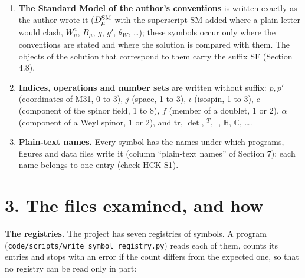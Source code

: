 \documentclass[
  10pt,
]{article}
\begin{document}
\begin{enumerate}
  the author's name of the group.
\item
  \textbf{The Standard Model of the author's conventions} is written
  exactly as the author wrote it (\(D^{\rm SM}_\mu\) with the
  superscript SM added where a plain letter would clash, \(W^a_\mu\),
  \(B_\mu\), \(g\), \(g'\), \(\theta_W\), \ldots); these symbols occur
  only where the conventions are stated and where the solution is
  compared with them. The objects of the solution that correspond to
  them carry the suffix SF (Section 4.8).
\item
  \textbf{Indices, operations and number sets} are written without
  suffix: \(p,p'\) (coordinates of M31, 0 to 3), \(j\) (space, 1 to 3),
  \(\iota\) (isospin, 1 to 3), \(c\) (component of the spinor field, 1
  to 8), \(f\) (member of a doublet, 1 or 2), \(\alpha\) (component of a
  Weyl spinor, 1 or 2), and \(\mathrm{tr}\), \(\det\), \({}^T\),
  \({}^\dagger\), \(\mathbb R\), \(\mathbb C\), \ldots.
\item
  \textbf{Plain-text names.} Every symbol has the names under which
  programs, figures and data files write it (column ``plain-text names''
  of Section 7); each name belongs to one entry (check HCK-S1).
\end{enumerate}

\hypertarget{the-files-examined-and-how}{%
\section{3. The files examined, and
how}\label{the-files-examined-and-how}}

\textbf{The registries.} The project has seven registries of symbols. A
program (\texttt{code/scripts/write\_symbol\_registry.py}) reads each of
them, counts its entries and stops with an error if the count differs
from the expected one, so that no registry can be read only in part:
\end{document}
